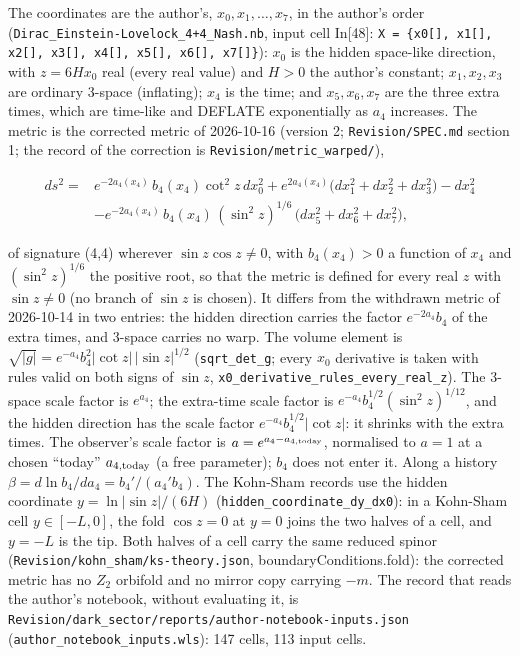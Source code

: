 \documentclass[11pt]{article}
\begin{document}
The coordinates are the author's, $x_0, x_1, \dots, x_7$, in the author's order (\texttt{Dirac\_Ei\allowbreak{}nstein-L\allowbreak{}ovelock\_\allowbreak{}4+4\_Nash\allowbreak{}.nb}, input cell In[48]: \texttt{X = \{x0[\allowbreak{}], x1[],\allowbreak{} x2[], x\allowbreak{}3[], x4[\allowbreak{}], x5[],\allowbreak{} x6[], x\allowbreak{}7[]\}}): $x_0$ is the hidden space-like direction, with $z = 6Hx_0$ real (every real value) and $H > 0$ the author's constant; $x_1, x_2, x_3$ are ordinary 3-space (inflating); $x_4$ is the time; and $x_5, x_6, x_7$ are the three extra times, which are time-like and DEFLATE exponentially as $a_4$ increases. The metric is the corrected metric of 2026-10-16 (version 2; \texttt{Revision\allowbreak{}/SPEC.md} section 1; the record of the correction is \texttt{Revision\allowbreak{}/metric\_\allowbreak{}warped/}),

\[
\begin{aligned}
ds^2 = {} & e^{-2a_4(x_4)}\,b_4(x_4)\cot^2 z\,dx_0^2 + e^{2a_4(x_4)}\big(dx_1^2+dx_2^2+dx_3^2\big) - dx_4^2 \\
& - e^{-2a_4(x_4)}\,b_4(x_4)\,(\sin^2 z)^{1/6}\,\big(dx_5^2+dx_6^2+dx_7^2\big) ,
\end{aligned}
\]

of signature (4,4) wherever $\sin z\cos z \neq 0$, with $b_4(x_4) > 0$ a function of $x_4$ and $(\sin^2 z)^{1/6}$ the positive root, so that the metric is defined for every real $z$ with $\sin z \neq 0$ (no branch of $\sin z$ is chosen). It differs from the withdrawn metric of 2026-10-14 in two entries: the hidden direction carries the factor $e^{-2a_4}b_4$ of the extra times, and 3-space carries no warp. The volume element is $\sqrt{|g|} = e^{-a_4}b_4^2\lvert\cot z\rvert\,\lvert\sin z\rvert^{1/2}$ (\texttt{sqrt\_det\allowbreak{}\_g}; every $x_0$ derivative is taken with rules valid on both signs of $\sin z$, \texttt{x0\_deriv\allowbreak{}ative\_ru\allowbreak{}les\_ever\allowbreak{}y\_real\_z}). The 3-space scale factor is $e^{a_4}$; the extra-time scale factor is $e^{-a_4}b_4^{1/2}(\sin^2 z)^{1/12}$, and the hidden direction has the scale factor $e^{-a_4}b_4^{1/2}\lvert\cot z\rvert$: it shrinks with the extra times. The observer's scale factor is $a = e^{a_4 - a_{4,\rm today}}$, normalised to $a = 1$ at a chosen ``today'' $a_{4,\rm today}$ (a free parameter); $b_4$ does not enter it. Along a history $\beta = d\ln b_4/da_4 = b_4'/(a_4'b_4)$. The Kohn-Sham records use the hidden coordinate $y = \ln\lvert\sin z\rvert/(6H)$ (\texttt{hidden\_c\allowbreak{}oordinat\allowbreak{}e\_dy\_dx0}): in a Kohn-Sham cell $y \in [-L, 0]$, the fold $\cos z = 0$ at $y = 0$ joins the two halves of a cell, and $y = -L$ is the tip. Both halves of a cell carry the same reduced spinor (\texttt{Revision\allowbreak{}/kohn\_sh\allowbreak{}am/ks-th\allowbreak{}eory.jso\allowbreak{}n}, boundaryConditions.fold): the corrected metric has no $Z_2$ orbifold and no mirror copy carrying $-m$. The record that reads the author's notebook, without evaluating it, is \texttt{Revision\allowbreak{}/dark\_se\allowbreak{}ctor/rep\allowbreak{}orts/aut\allowbreak{}hor-note\allowbreak{}book-inp\allowbreak{}uts.json} (\texttt{author\_n\allowbreak{}otebook\_\allowbreak{}inputs.w\allowbreak{}ls}): 147 cells, 113 input cells.
\end{document}
